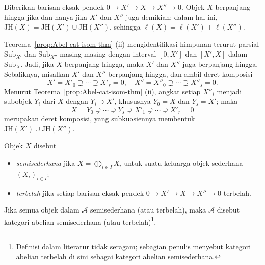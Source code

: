 \begin{lema}
    Diberikan barisan eksak pendek $0\to X'\to X\to X''\to0$. Objek $X$
berpanjang hingga jika dan hanya jika $X'$ dan $X''$ juga demikian; dalam hal
ini, $\mathrm{JH}(X)=\mathrm{JH}(X')\cup\mathrm{JH}(X'')$, sehingga
$\ell(X)=\ell(X')+\ell(X'')$.
\end{lema}
\begin{bukti}
    Teorema~\ref{prop:Abel-cat-isom-thm} (ii) mengidentifikasi himpunan terurut
parsial $\mathrm{Sub}_{X'}$ dan $\mathrm{Sub}_{X''}$ masing-masing dengan
interval $[0,X']$ dan $[X',X]$ dalam $\mathrm{Sub}_X$. Jadi, jika $X$
berpanjang hingga, maka $X'$ dan $X''$ juga berpanjang hingga. Sebaliknya,
misalkan $X'$ dan $X''$ berpanjang hingga, dan ambil deret komposisi
\[ X'=X'_0\supsetneq\cdots\supsetneq X'_r=0,\quad
X''=X''_0\supsetneq\cdots\supsetneq X''_s=0. \]
Menurut Teorema~\ref{prop:Abel-cat-isom-thm} (ii), angkat setiap $X''_i$
menjadi subobjek $Y_i$ dari $X$ dengan $Y_i\supset X'$, khususnya $Y_0=X$
dan $Y_s=X'$; maka
\[ X=Y_0\supsetneq\cdots\supsetneq Y_s\supsetneq X'_1\supsetneq\cdots
\supsetneq X'_r=0 \]
merupakan deret komposisi, yang subkuosiennya membentuk
$\mathrm{JH}(X')\cup\mathrm{JH}(X'')$.
\end{bukti}

\begin{definisi}\label{def:semisimple}
    Objek $X$ disebut
    \begin{itemize}
        \item \emph{semisederhana} jika
        $X=\bigoplus_{i\in I}X_i$ untuk suatu keluarga objek sederhana
        $(X_i)_{i\in I}$;
        \item \emph{terbelah} jika setiap barisan eksak pendek
        $0\to X'\to X\to X''\to0$ terbelah.
    \end{itemize}
    Jika semua objek dalam $\mathcal{A}$ semisederhana (atau terbelah), maka
    $\mathcal{A}$ disebut
    kategori abelian semisederhana (atau terbelah)\footnote{Definisi dalam
    literatur tidak seragam; sebagian penulis menyebut kategori abelian terbelah
    di sini sebagai kategori abelian semisederhana.}.
\end{definisi}

